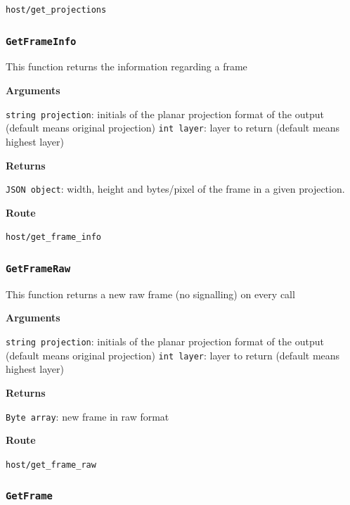 \documentclass{article}
\begin{document}
\texttt{host/get_projections}



\subsubsection*{\texttt{GetFrameInfo}}

This function returns the information regarding a frame

\textbf{Arguments}

\texttt{string projection}: initials of the planar projection format of the output (default means original projection)
\texttt{int layer}: layer to return (default means highest layer)

\textbf{Returns}

\texttt{JSON object}:  width, height and bytes/pixel of the frame in a given projection.

\textbf{Route}

\texttt{host/get_frame_info}


\subsubsection*{\texttt{GetFrameRaw}}

This function returns a new raw frame (no signalling) on every call

\textbf{Arguments}

\texttt{string projection}: initials of the planar projection format of the output (default means original projection)
\texttt{int layer}: layer to return (default means highest layer)

\textbf{Returns}

\texttt{Byte array}: new frame in raw format

\textbf{Route}

\texttt{host/get_frame_raw}


\subsubsection*{\texttt{GetFrame}}
\end{document}
